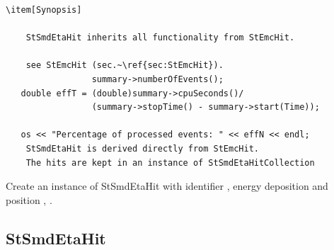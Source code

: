 \begin{Entry}
{\begin{verbatim}
\item[Synopsis] 

    StSmdEtaHit inherits all functionality from StEmcHit.
    
    see StEmcHit (sec.~\ref{sec:StEmcHit}).
                 summary->numberOfEvents();
   double effT = (double)summary->cpuSeconds()/
                 (summary->stopTime() - summary->start(Time));
    
   os << "Percentage of processed events: " << effN << endl;
    StSmdEtaHit is derived directly from StEmcHit.
    The hits are kept in an instance of StSmdEtaHitCollection
\end{verbatim}
}%

\end{Entry}

    Create an instance of StSmdEtaHit with identifier ,
    energy deposition  and position , .
%
\subsection{StSmdEtaHit}
    
